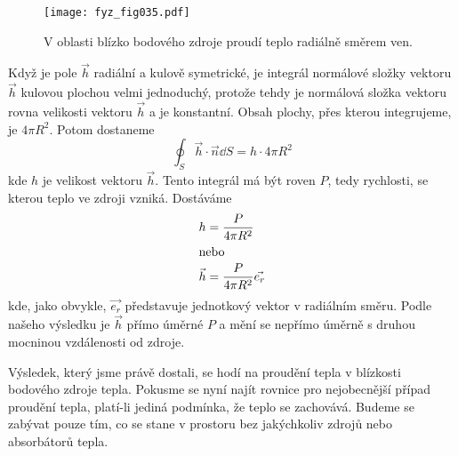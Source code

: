       \begin{figure}[ht!]  %
        \centering
        \texttt{[image: fyz\_fig035.pdf]}
        \caption{V oblasti blízko bodového zdroje proudí teplo radiálně směrem ven.}
        \label{fyz:fig035}
      \end{figure}      
      Když je pole \(\vec{h}\) radiální a kulově symetrické, je integrál normálové složky vektoru 
      \(\vec{h}\) kulovou plochou velmi jednoduchý, protože tehdy je normálová složka vektoru rovna 
      velikosti vektoru \(\vec{h}\) a je konstantní. Obsah plochy, přes kterou integrujeme, je 
      \(4\pi R^2\). Potom dostaneme 
      \begin{equation}\label{fyz:eq_gauss6}
       \oint_S\vec{h}\cdot\vec{n}\dd{S} = h\cdot4\pi R^2
      \end{equation}
      kde \(h\) je velikost vektoru \(\vec{h}\). Tento integrál má být roven \(P\), tedy rychlosti, 
      se kterou teplo ve zdroji vzniká. Dostáváme
      \begin{align}
       h       &= \frac{P}{4\pi R^2}                \nonumber                  \\
       \shortintertext{nebo}
       \vec{h} &= \frac{P}{4\pi R^2}\vec{e_r}       \label{fyz:eq_gauss7}
      \end{align} 
      kde, jako obvykle, \(\vec{e_r}\) představuje jednotkový vektor v radiálním směru. Podle 
      našeho výsledku je \(\vec{h}\) přímo úměrné \(P\) a mění se nepřímo úměrně s druhou mocninou 
      vzdálenosti od zdroje.
      
      Výsledek, který jsme právě dostali, se hodí na proudění tepla v blízkosti bodového zdroje 
      tepla. Pokusme se nyní najít rovnice pro nejobecnější případ proudění tepla, platí-li jediná 
      podmínka, že teplo se zachovává. Budeme se zabývat pouze tím, co se stane v prostoru bez 
      jakýchkoliv zdrojů nebo absorbátorů tepla.
      
